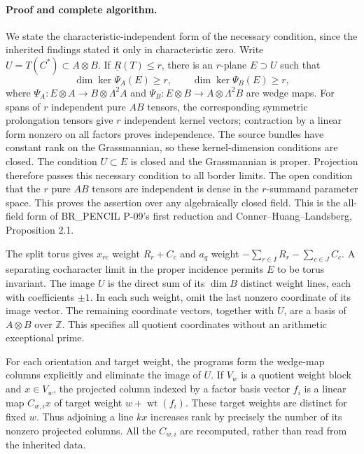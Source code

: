 \paragraph{Proof and complete algorithm.}
We state the characteristic-independent form of the necessary condition,
since the inherited findings stated it only in characteristic zero.
Write $U=T(C^*)\subset A\otimes B$.  If $\underline R(T)\le r$, there is
an $r$-plane $E\supset U$ such that
\[
 \dim\ker\Psi_A(E)\ge r,\qquad \dim\ker\Psi_B(E)\ge r,
\]
where $\Psi_A:E\otimes A\to B\otimes\Lambda^2A$ and
$\Psi_B:E\otimes B\to A\otimes\Lambda^2B$ are wedge maps.
For spans of $r$ independent pure $AB$ tensors, the corresponding symmetric
prolongation tensors give $r$ independent kernel vectors; contraction by a
linear form nonzero on all factors proves independence.  The source bundles
have constant rank on the Grassmannian, so these kernel-dimension conditions
are closed.  The condition $U\subset E$ is closed and the Grassmannian is
proper.  Projection therefore passes this necessary condition to all border
limits.  The open condition that the $r$ pure $AB$ tensors are independent
is dense in the $r$-summand parameter space.  This proves the assertion over
any algebraically closed field.  This is the all-field form of BR\_PENCIL
P-09's first reduction and Conner--Huang--Landsberg, Proposition 2.1.

The split torus gives $x_{rc}$ weight $R_r+C_c$ and $a_q$ weight
$-\sum_{r\in I}R_r-\sum_{c\in J}C_c$.  A separating cocharacter limit in the
proper incidence permits $E$ to be torus invariant.  The image $U$ is the
direct sum of its $\dim B$ distinct weight lines, each with coefficients
$\pm1$.  In each such weight, omit the last nonzero coordinate of its image
vector.  The remaining coordinate vectors, together with $U$, are a basis
of $A\otimes B$ over $\mathbb Z$.  This specifies all quotient coordinates
without an arithmetic exceptional prime.

For each orientation and target weight, the programs form the wedge-map
columns explicitly and eliminate the image of $U$.  If $V_w$ is a quotient
weight block and $x\in V_w$, the projected column indexed by a factor basis
vector $f_i$ is a linear map $C_{w,i}x$ of target weight $w+\operatorname{wt}(f_i)$.
These target weights are distinct for fixed $w$.  Thus adjoining a line
$kx$ increases rank by precisely the number of its nonzero projected columns.
All the $C_{w,i}$ are recomputed, rather than read from the inherited data.

